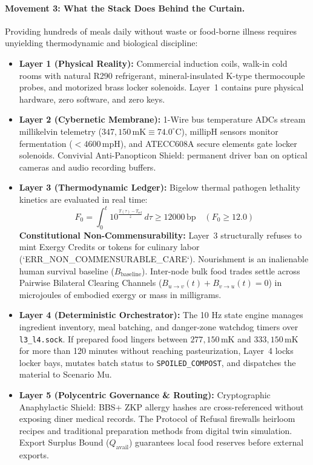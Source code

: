 \paragraph{Movement 3: What the Stack Does Behind the Curtain.}
Providing hundreds of meals daily without waste or food-borne illness requires unyielding thermodynamic and biological discipline:
\begin{itemize}
    \item \textbf{Layer 1 (Physical Reality):} Commercial induction coils, walk-in cold rooms with natural R290 refrigerant, mineral-insulated K-type thermocouple probes, and motorized brass locker solenoids. Layer~1 contains pure physical hardware, zero software, and zero keys.
    \item \textbf{Layer 2 (Cybernetic Membrane):} 1-Wire bus temperature ADCs stream millikelvin telemetry ($347{,}150\,\mathrm{mK} \equiv 74.0^\circ\mathrm{C}$), millipH sensors monitor fermentation ($< 4600\,\mathrm{mpH}$), and ATECC608A secure elements gate locker solenoids. Convivial Anti-Panopticon Shield: permanent driver ban on optical cameras and audio recording buffers.
    \item \textbf{Layer 3 (Thermodynamic Ledger):} Bigelow thermal pathogen lethality kinetics are evaluated in real time:
    \[
    F_0 = \int_{0}^{t} 10^{\frac{T(\tau) - T_{\mathrm{ref}}}{z}} \, d\tau \ge 12000\,\mathrm{bp} \quad (F_0 \ge 12.0)
    \]
    \textbf{Constitutional Non-Commensurability:} Layer~3 structurally refuses to mint Exergy Credits or tokens for culinary labor (`ERR\_NON\_COMMENSURABLE\_CARE`). Nourishment is an inalienable human survival baseline ($B_{\mathrm{baseline}}$). Inter-node bulk food trades settle across Pairwise Bilateral Clearing Channels ($B_{u \to v}(t) + B_{v \to u}(t) = 0$) in microjoules of embodied exergy or mass in milligrams.
    \item \textbf{Layer 4 (Deterministic Orchestrator):} The 10 Hz state engine manages ingredient inventory, meal batching, and danger-zone watchdog timers over \texttt{l3\_l4.sock}. If prepared food lingers between $277{,}150\,\mathrm{mK}$ and $333{,}150\,\mathrm{mK}$ for more than 120 minutes without reaching pasteurization, Layer~4 locks locker bays, mutates batch status to \texttt{SPOILED\_COMPOST}, and dispatches the material to Scenario Mu.
    \item \textbf{Layer 5 (Polycentric Governance \& Routing):} Cryptographic Anaphylactic Shield: BBS+ ZKP allergy hashes are cross-referenced without exposing diner medical records. The Protocol of Refusal firewalls heirloom recipes and traditional preparation methods from digital twin simulation. Export Surplus Bound ($Q_{\mathrm{avail}}$) guarantees local food reserves before external exports.

\end{itemize}
